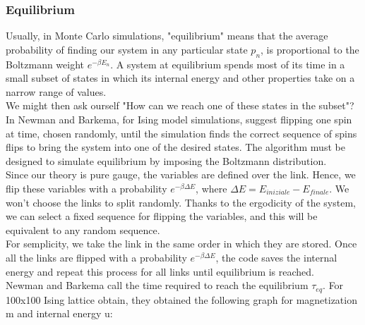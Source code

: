         \subsubsection{Equilibrium}
        Usually, in Monte Carlo simulations, "equilibrium" means that the average probability of finding our system in any particular state $p_n$, is proportional to the Boltzmann weight $e^{-\beta E_n}$. 
        A system at equilibrium spends most of its time in a small subset of states in which its internal energy and other properties take on a narrow range of values. \\
        We might then ask ourself "How can we reach one of these states in the subset"? \\
        In \cite{NewBar} Newman and Barkema, for Ising model simulations, suggest flipping one spin at time, chosen randomly, 
        until the simulation finds the correct sequence of spins flips
        to bring the system into one of the desired states. The algorithm must be designed to simulate equilibrium by imposing the Boltzmann distribution.\\
        Since our theory is pure gauge, the variables are defined over the link. Hence, we flip these variables with a probability $e^{- \beta \Delta E}$, where $\Delta E= E_{iniziale}-E_{finale}$.
        We won't choose the links to split randomly. Thanks to the ergodicity of the system, we can select a fixed sequence for flipping the variables, and this will be equivalent to any random
        sequence.\\
        For semplicity, we take the link in the same order in which they are stored. Once all the links are flipped with a probability $e^{- \beta \Delta E}$, the code saves the 
        internal energy and repeat this process for all links until equilibrium is reached. \\
        Newman and Barkema \cite{NewBar} call the time required to reach the equilibrium $\tau_{eq}$. For 100x100 Ising lattice obtain, they obtained the following graph for magnetization m and
        internal energy u: \\
        \noindent
